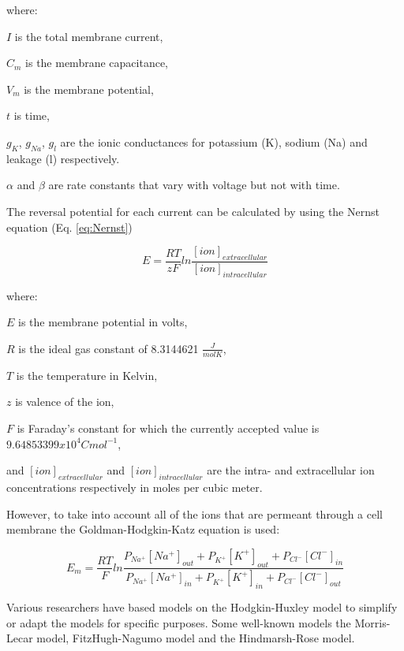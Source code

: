 where:

$I$ is the total membrane current,

$C_{m}$ is the membrane capacitance,

$V_{m}$ is the membrane potential,

$t$ is time,

$g_{K}$, $g_{Na}$, $g_{l}$ are the ionic conductances for potassium (K), sodium (Na) and leakage (l) respectively. 

$\alpha$ and $\beta$ are rate constants that vary with voltage but not with time.

The reversal potential for each current can be calculated by using the Nernst equation (Eq. \ref{eq:Nernst})


\begin{equation}
\label{eq:Nernst}
E = \frac{RT}{zF}ln\frac{[ion]_{extracellular}}{[ion]_{intracellular}}
\end{equation}

where:

$E$ is the membrane potential in volts,

$R$ is the ideal gas constant of 8.3144621 $\frac{J}{mol K}$,

$T$ is the temperature in Kelvin,

$z$ is valence of the ion,

$F$ is Faraday's constant for which the currently accepted value is $9.64853399 x 10^{4}C mol^{-1}$,

and $[ion]_{extracellular}$ and $[ion]_{intracellular}$ are the intra- and extracellular ion concentrations respectively in moles per cubic meter.

However, to take into account all of the ions that are permeant through a cell membrane the Goldman-Hodgkin-Katz equation is used:

\begin{equation}\label{eq:GHK}
E_{m} = \frac{RT}{F}ln\frac{P_{Na^{+}}[Na^{+}]_{out}+P_{K^{+}}[K^{+}]_{out}+P_{Cl^{-}}[Cl^{-}] _{in}}{P_{Na^{+}}[Na^{+}]_{in}+P_{K^{+}}[K^{+}]_{in}+P_{Cl^{-}}[Cl^{-}]_{out}}
\end{equation}

Various researchers have based models on the Hodgkin-Huxley model to simplify or adapt the models for specific purposes. Some well-known models the Morris-Lecar \cite{Morris1981} model, FitzHugh-Nagumo \cite{Fitzhugh1961, Nagumo1962} model and the Hindmarsh-Rose model.

